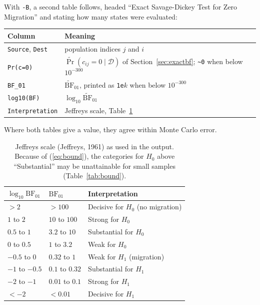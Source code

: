 \documentclass[11pt,a4paper]{article}
\newcommand{\BF}{\mathrm{BF}}
\newcommand{\data}{\mathcal{D}}
\newcommand{\1}{\mathbf{1}}
\begin{document}
With \texttt{-B}, a second table follows, headed ``Exact Savage-Dickey Test for
Zero Migration'' and stating how many states were evaluated:
\begin{center}
\small
\begin{tabular}{ll}
\toprule
Column & Meaning \\
\midrule
\texttt{Source}, \texttt{Dest} & population indices $j$ and $i$ \\
\texttt{Pr(c=0)} & $\widetilde{\Pr}(c_{ij}=0\mid\data)$ of Section~\ref{sec:exactbf}; \texttt{\textasciitilde 0} when below $10^{-300}$ \\
\texttt{BF\_01} & $\widetilde{\BF}_{01}$, printed as \texttt{1e}$k$ when below $10^{-300}$ \\
\texttt{log10(BF)} & $\log_{10}\widetilde{\BF}_{01}$ \\
\texttt{Interpretation} & Jeffreys scale, Table~\ref{tab:jeffreys} \\
\bottomrule
\end{tabular}
\end{center}
Where both tables give a value, they agree within Monte Carlo error.

\begin{table}[h]
\centering
\begin{tabular}{lll}
\toprule
$\log_{10}\BF_{01}$ & $\BF_{01}$ & Interpretation \\
\midrule
$> 2$ & $> 100$ & Decisive for $H_0$ (no migration) \\
$1$ to $2$ & $10$ to $100$ & Strong for $H_0$ \\
$0.5$ to $1$ & $3.2$ to $10$ & Substantial for $H_0$ \\
$0$ to $0.5$ & $1$ to $3.2$ & Weak for $H_0$ \\
$-0.5$ to $0$ & $0.32$ to $1$ & Weak for $H_1$ (migration) \\
$-1$ to $-0.5$ & $0.1$ to $0.32$ & Substantial for $H_1$ \\
$-2$ to $-1$ & $0.01$ to $0.1$ & Strong for $H_1$ \\
$< -2$ & $< 0.01$ & Decisive for $H_1$ \\
\bottomrule
\end{tabular}
\caption{Jeffreys scale (Jeffreys, 1961) as used in the output. Because of
(\ref{eq:bound}), the categories for $H_0$ above ``Substantial'' may be
unattainable for small samples (Table~\ref{tab:bound}).}
\label{tab:jeffreys}
\end{table}

\end{document}
